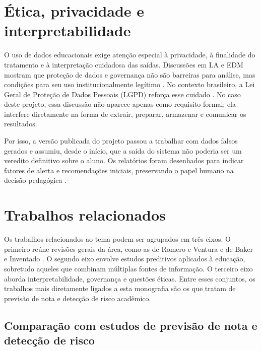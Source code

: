 \section{\'Etica, privacidade e interpretabilidade}
\label{sec:etica-privacidade-interpretabilidade}

O uso de dados educacionais exige aten\c{c}\~ao especial \`a privacidade, \`a finalidade do tratamento e \`a interpreta\c{c}\~ao cuidadosa das sa\'idas. Discuss\~oes em LA e EDM mostram que prote\c{c}\~ao de dados e governan\c{c}a n\~ao s\~ao barreiras para an\'alise, mas condi\c{c}\~oes para seu uso institucionalmente leg\'itimo \cite{slade2013,gasevic2016,khalil2016}. No contexto brasileiro, a Lei Geral de Prote\c{c}\~ao de Dados Pessoais (LGPD) refor\c{c}a esse cuidado \cite{lgpd}. No caso deste projeto, essa discuss\~ao n\~ao aparece apenas como requisito formal: ela interfere diretamente na forma de extrair, preparar, armazenar e comunicar os resultados.

Por isso, a vers\~ao publicada do projeto passou a trabalhar com dados falsos gerados e assumiu, desde o in\'icio, que a sa\'ida do sistema n\~ao poderia ser um veredito definitivo sobre o aluno. Os relat\'orios foram desenhados para indicar fatores de alerta e recomenda\c{c}\~oes iniciais, preservando o papel humano na decis\~ao pedag\'ogica \cite{fiok2022}.

\section{Trabalhos relacionados}
\label{sec:trabalhos-relacionados}

Os trabalhos relacionados ao tema podem ser agrupados em tr\^es eixos. O primeiro re\'une revis\~oes gerais da \'area, como as de Romero e Ventura \cite{romero2010} e de Baker e Inventado \cite{baker2014}. O segundo eixo envolve estudos preditivos aplicados \`a educa\c{c}\~ao, sobretudo aqueles que combinam m\'ultiplas fontes de informa\c{c}\~ao. O terceiro eixo aborda interpretabilidade, governan\c{c}a e quest\~oes \'eticas. Entre esses conjuntos, os trabalhos mais diretamente ligados a esta monografia s\~ao os que tratam de previs\~ao de nota e detec\c{c}\~ao de risco acad\^emico.

\subsection{Compara\c{c}\~ao com estudos de previs\~ao de nota e detec\c{c}\~ao de risco}
\label{subsec:comparacao-trabalhos}

